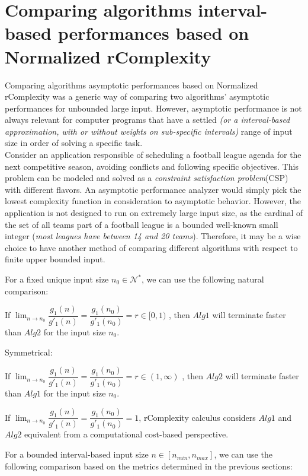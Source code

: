 \section{Comparing algorithms interval-based performances based on Normalized rComplexity}
Comparing algorithms asymptotic performances based on Normalized rComplexity was a generic way of comparing two algorithms' asymptotic performances for unbounded large input. However, asymptotic performance is not always relevant for computer programs that have a settled \textit{(or a interval-based approximation, with or without weights on sub-specific intervals)} range of input size in order of solving a specific task. 
\\ Consider an application responsible of scheduling a football league agenda for the next competitive season, avoiding conflicts and following specific objectives. This problem can be modeled and solved as a \textit{constraint satisfaction problem}(CSP) with different flavors.  An asymptotic performance analyzer would simply pick the lowest complexity function in consideration to asymptotic behavior. However, the application is not designed to run on extremely large input size, as the cardinal of the set of all teams part of a football league is a bounded well-known small integer (\textit{most leagues have between 14 and 20 teams}). Therefore, it may be a wise choice to have another method of comparing different algorithms with respect to finite upper bounded input.

For a fixed unique input size $n_{0}\in \mathcal{N}^{*}$, we can use the following natural comparison:
\begin{lemma}
If  $ \lim_{n\to n_{0}} \dfrac{g_{1}(n)}{g'_{1}(n)} = \dfrac{g_{1}(n_{0})}{g'_{1}(n_{0})} = r \in [0,1) $ , then $Alg1$ will terminate faster than $Alg2$ for the input size $n_{0}$.
\end{lemma}
Symmetrical:
\begin{lemma}
If  $ \lim_{n\to n_{0}} \dfrac{g_{1}(n)}{g'_{1}(n)} = \dfrac{g_{1}(n_{0})}{g'_{1}(n_{0})} = r \in (1,\infty) $ , then $Alg2$ will terminate faster than $Alg1$ for the input size $n_{0}$.
\end{lemma}
\begin{remark}
If  $ \lim_{n\to n_{0}} \dfrac{g_{1}(n)}{g'_{1}(n)} = \dfrac{g_{1}(n_{0})}{g'_{1}(n_{0})} = 1$, rComplexity calculus considers $Alg1$ and $Alg2$ equivalent from a computational cost-based perspective.
\end{remark}

For a bounded interval-based input size $n \in [n_{min}, n_{max}]$, we can use the following comparison based on the metrics determined in the previous sections:

